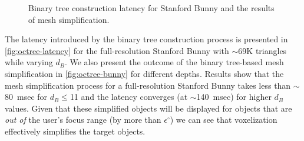 \begin{figure}[t]
    \centering
    \vspace{-1ex}
    \hfill
    \vspace{-2ex}
    \caption{Binary tree construction latency for Stanford Bunny and 
        the results of mesh simplification.}
    \label{fig:octreeConstructionLatency}
\end{figure}


The latency introduced by the binary tree construction process is presented in 
\fig\ref{fig:octree-latency} for the full-resolution Stanford Bunny with 
$\sim$69K triangles while varying $d_B$.
%
We also present the outcome of the binary tree-based mesh simplification in 
\fig\ref{fig:octree-bunny} for different depths. Results show that the mesh 
simplification process for a full-resolution Stanford Bunny takes less than 
$\sim$80~msec for $d_B\le$11 and the latency converges (at $\sim$140~msec) for 
higher $d_B$ values.
%
Given that these simplified objects will be displayed for objects that are 
\textit{out of} the user's focus range (by more than $\epsilon^\circ$) we can 
see that voxelization effectively simplifies the target objects.
%


